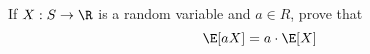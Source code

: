  If $X: S \rightarrow \R$ is a random variable and $a \in R$,
  prove that
  \[
    \E[aX] = a \cdot \E[X]
  \]
